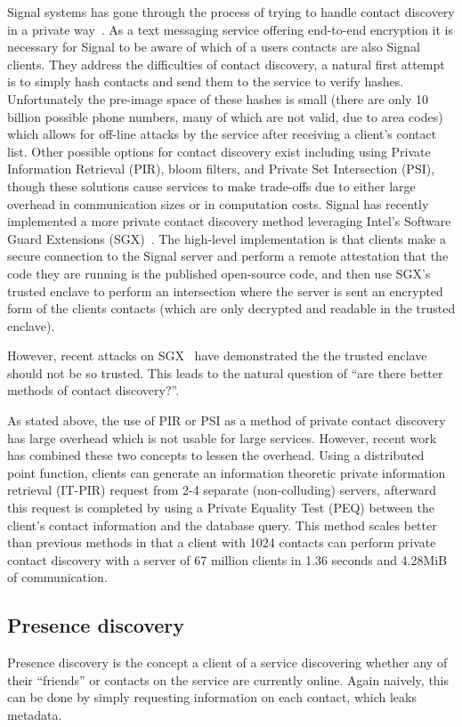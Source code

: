 Signal systems has gone through the process of trying to handle contact
discovery in a private way~\cite{marlinspike_2014}. As a text messaging service
offering end-to-end encryption it is necessary for Signal to be aware of which
of a users contacts are also Signal clients. They address the difficulties of
contact discovery, a natural first attempt is to simply hash contacts and send
them to the service to verify hashes. Unfortunately the pre-image space of these
hashes is small (there are only 10 billion possible phone numbers, many of which
are not valid, due to area codes) which allows for off-line attacks by the
service after receiving a client's contact list. Other possible options for
contact discovery exist including using Private Information Retrieval (PIR),
bloom filters, and Private Set Intersection (PSI), though these solutions cause
services to make trade-offs due to either large overhead in communication sizes
or in computation costs. Signal has recently implemented a more private contact
discovery method leveraging Intel's Software Guard Extensions
(SGX)~\cite{marlinspike_2017}. The high-level implementation is that clients
make a secure connection to the Signal server and perform a remote attestation
that the code they are running is the published open-source code, and then use
SGX's trusted enclave to perform an intersection where the server is sent an
encrypted form of the clients contacts (which are only decrypted and readable in
the trusted enclave). 

However, recent attacks on SGX~\cite{van2018foreshadow} have demonstrated the
the trusted enclave should not be so trusted. This leads to the natural question
of ``are there better methods of contact discovery?''. 

As stated above, the use of PIR or PSI as a method of private contact discovery
has large overhead which is not usable for large services. However, recent
work~\cite{demmler2018pir} has combined these two concepts to lessen the
overhead. Using a distributed point function, clients can generate an
information theoretic private information retrieval (IT-PIR) request from 2-4
separate (non-colluding) servers, afterward this request is completed by using a
Private Equality Test (PEQ) between the client's contact information and the
database query. This method scales better than previous methods in that a client
with 1024 contacts can perform private contact discovery with a server of 67
million clients in 1.36 seconds and 4.28MiB of communication.

\subsection{Presence discovery}
Presence discovery is the concept a client of a service discovering whether any
of their ``friends'' or contacts on the service are currently online. Again
naively, this can be done by simply requesting information on each contact,
which leaks metadata.

